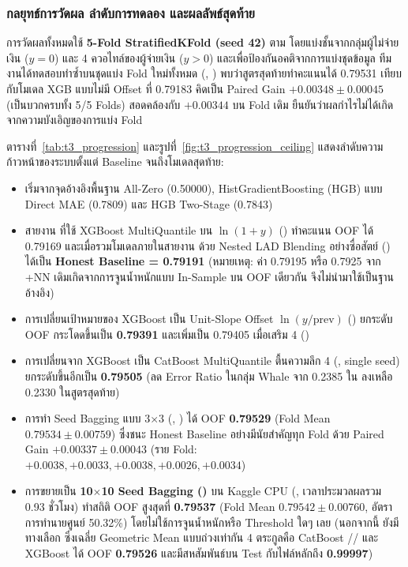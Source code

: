 \subsubsection{กลยุทธ์การวัดผล ลำดับการทดลอง และผลลัพธ์สุดท้าย}
\label{subsubsec:t3_progression}

การวัดผลทั้งหมดใช้ \textbf{5-Fold StratifiedKFold (seed 42)} ตาม  โดยแบ่งชั้นจากกลุ่มผู้ไม่จ่ายเงิน ($y=0$) และ 4 ควอไทล์ของผู้จ่ายเงิน ($y>0$) และเพื่อป้องกันอคติจากการแบ่งชุดข้อมูล ทีมงานได้ทดสอบทำซ้ำบนชุดแบ่ง Fold ใหม่ทั้งหมด (, ) พบว่าสูตรสุดท้ายทำคะแนนได้ 0.79531 เทียบกับโมเดล XGB แบบไม่มี Offset ที่ 0.79183 คิดเป็น Paired Gain \textbf{$+0.00348 \pm 0.00045$} (เป็นบวกครบทั้ง 5/5 Folds) สอดคล้องกับ $+0.00344$ บน Fold เดิม ยืนยันว่าผลกำไรไม่ได้เกิดจากความบังเอิญของการแบ่ง Fold

ตารางที่~\ref{tab:t3_progression} และรูปที่~\ref{fig:t3_progression_ceiling} แสดงลำดับความก้าวหน้าของระบบตั้งแต่ Baseline จนถึงโมเดลสุดท้าย:
\begin{itemize}
    \item เริ่มจากจุดอ้างอิงพื้นฐาน All-Zero (0.50000), HistGradientBoosting (HGB) แบบ Direct MAE (0.7809) และ HGB Two-Stage (0.7843)
    \item สายงาน  ที่ใช้ XGBoost MultiQuantile บน $\ln(1+y)$ () ทำคะแนน OOF ได้ 0.79169 และเมื่อรวมโมเดลภายในสายงาน  ด้วย Nested LAD Blending อย่างซื่อสัตย์ () ได้เป็น \textbf{Honest Baseline = 0.79191} (หมายเหตุ: ค่า 0.79195 หรือ 0.7925 จาก +NN เดิมเกิดจากการจูนน้ำหนักแบบ In-Sample บน OOF เดียวกัน จึงไม่นำมาใช้เป็นฐานอ้างอิง)
    \item การเปลี่ยนเป้าหมายของ XGBoost เป็น Unit-Slope Offset $\ln(y / \text{prev})$ () ยกระดับ OOF กระโดดขึ้นเป็น \textbf{0.79391} และเพิ่มเป็น 0.79405 เมื่อเสริม 4  ()
    \item การเปลี่ยนจาก XGBoost เป็น CatBoost MultiQuantile ตื้นความลึก 4 (, single seed) ยกระดับขึ้นอีกเป็น \textbf{0.79505} (ลด Error Ratio ในกลุ่ม Whale จาก 0.2385 ใน  ลงเหลือ 0.2330 ในสูตรสุดท้าย)
    \item การทำ Seed Bagging แบบ 3$\times$3 (, ) ได้ OOF \textbf{0.79529} (Fold Mean $0.79534 \pm 0.00759$) ซึ่งชนะ Honest Baseline  อย่างมีนัยสำคัญทุก Fold ด้วย Paired Gain \textbf{$+0.00337 \pm 0.00043$} (ราย Fold: $+0.0038, +0.0033, +0.0038, +0.0026, +0.0034$)
    \item การขยายเป็น \textbf{10$\times$10 Seed Bagging ()} บน Kaggle CPU (, เวลาประมวลผลรวม 0.93 ชั่วโมง) ทำสถิติ OOF สูงสุดที่ \textbf{0.79537} (Fold Mean \textbf{$0.79542 \pm 0.00760$}, อัตราการทำนายศูนย์ 50.32\%) โดยไม่ใช้การจูนน้ำหนักหรือ Threshold ใดๆ เลย (นอกจากนี้ ยังมีทางเลือก  ซึ่งเฉลี่ย Geometric Mean แบบถ่วงเท่ากัน 4 ตระกูลคือ CatBoost // และ XGBoost  ได้ OOF \textbf{0.79526} และมีสหสัมพันธ์บน Test กับไฟล์หลักถึง \textbf{0.99997})
\end{itemize}

